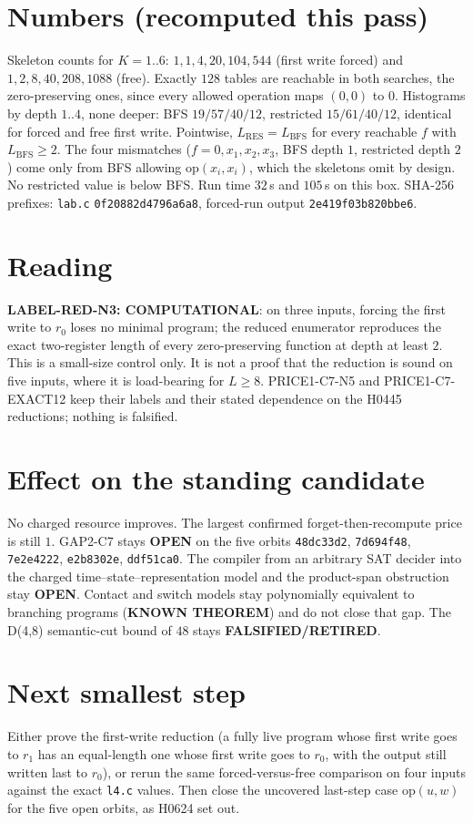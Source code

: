 \documentclass[11pt]{article}
\begin{document}
\section*{Numbers (recomputed this pass)}
Skeleton counts for $K=1..6$: $1,1,4,20,104,544$ (first write forced) and $1,2,8,40,208,1088$ (free). Exactly $128$ tables are reachable in both searches, the zero-preserving ones, since every allowed operation maps $(0,0)$ to $0$. Histograms by depth $1..4$, none deeper: BFS $19/57/40/12$, restricted $15/61/40/12$, identical for forced and free first write. Pointwise, $L_{\mathrm{RES}}=L_{\mathrm{BFS}}$ for every reachable $f$ with $L_{\mathrm{BFS}}\ge2$. The four mismatches ($f=0,x_1,x_2,x_3$, BFS depth $1$, restricted depth $2$) come only from BFS allowing $\mathrm{op}(x_i,x_i)$, which the skeletons omit by design. No restricted value is below BFS. Run time $32$\,s and $105$\,s on this box. SHA-256 prefixes: \texttt{lab.c} \texttt{0f20882d4796a6a8}, forced-run output \texttt{2e419f03b820bbe6}.

\section*{Reading}
\textbf{LABEL-RED-N3: COMPUTATIONAL}: on three inputs, forcing the first write to $r_0$ loses no minimal program; the reduced enumerator reproduces the exact two-register length of every zero-preserving function at depth at least $2$. This is a small-size control only. It is not a proof that the reduction is sound on five inputs, where it is load-bearing for $L\ge8$. PRICE1-C7-N5 and PRICE1-C7-EXACT12 keep their labels and their stated dependence on the H0445 reductions; nothing is falsified.

\section*{Effect on the standing candidate}
No charged resource improves. The largest confirmed forget-then-recompute price is still $1$. GAP2-C7 stays \textbf{OPEN} on the five orbits \texttt{48dc33d2}, \texttt{7d694f48}, \texttt{7e2e4222}, \texttt{e2b8302e}, \texttt{ddf51ca0}. The compiler from an arbitrary SAT decider into the charged time--state--representation model and the product-span obstruction stay \textbf{OPEN}. Contact and switch models stay polynomially equivalent to branching programs (\textbf{KNOWN THEOREM}) and do not close that gap. The D(4,8) semantic-cut bound of $48$ stays \textbf{FALSIFIED/RETIRED}.

\section*{Next smallest step}
Either prove the first-write reduction (a fully live program whose first write goes to $r_1$ has an equal-length one whose first write goes to $r_0$, with the output still written last to $r_0$), or rerun the same forced-versus-free comparison on four inputs against the exact \texttt{l4.c} values. Then close the uncovered last-step case $\mathrm{op}(u,w)$ for the five open orbits, as H0624 set out.
\end{document}

